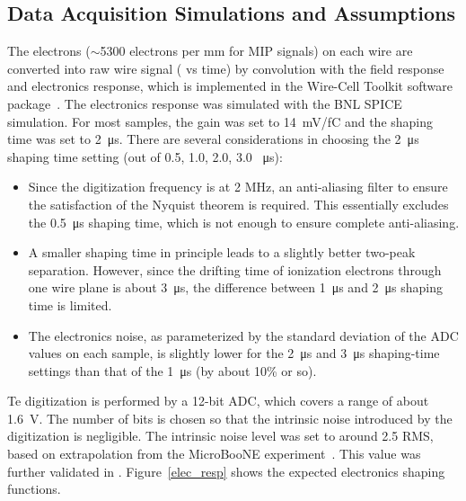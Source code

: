\subsection{Data Acquisition Simulations and Assumptions}
\label{sec:tools-mc-daq}


  The electrons ($\sim$5300 electrons per mm for MIP signals) on each wire are converted into raw wire signal ( vs time) by convolution with the field response and electronics response, which is implemented in the Wire-Cell Toolkit software package~\cite{ref:wire_cell_toolkit}.
  The  electronics response was simulated with the BNL SPICE~\cite{spice} simulation.  For most samples, the  gain was set to \SI{14}{mV/fC} and the shaping time was set to \SI{2}{\micro\second}. There are several considerations in choosing the \SI{2}{\micro\second} shaping time setting (out of 0.5, 1.0, 2.0, 3.0 \SI{}{\micro\second}):
  \begin{itemize}
\item Since the digitization frequency is at 2 MHz, an anti-aliasing filter to ensure the satisfaction of the Nyquist theorem is required. This essentially excludes the \SI{0.5}{\micro\second} shaping time, which is not enough  to ensure complete anti-aliasing. 
\item A smaller shaping time in principle leads to a slightly better two-peak separation. However, since the drifting time of ionization electrons through one wire plane is about \SI{3}{\micro\second}, the difference between \SI{1}{\micro\second} and \SI{2}{\micro\second} shaping time is limited. 
\item The electronics noise, as parameterized by the standard deviation of the ADC values on each sample, is slightly lower for the \SI{2}{\micro\second} and \SI{3}{\micro\second} shaping-time settings than that of the \SI{1}{\micro\second} (by about 10\% or so). 
\end{itemize}
Te digitization is performed by a 12-bit ADC, which covers a range of about \SI{1.6}{V}. The number of bits is chosen so that the intrinsic noise
introduced by the digitization is negligible.  The intrinsic noise level was set to around 2.5  RMS, based on extrapolation 
  from the MicroBooNE experiment~\cite{Acciarri:2017sde}. This value was further validated in . %
  Figure~\ref{elec_resp} shows the expected electronics shaping functions.

